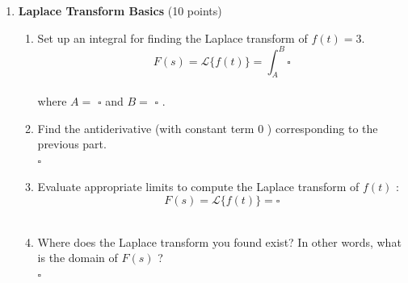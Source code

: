 \begin{enumerate}
  \item \textbf{Laplace Transform Basics} (10 points)\\
  \begin{enumerate}[label=\alph*]
    \item Set up an integral for finding the Laplace transform of $f(t)=3$.\\
    $$
    F(s)=\mathcal{L}\{f(t)\}=\int_A^B \square
    $$\\
    where $A=$ $\square$ and $B=$ $\square$ .\\
    \begin{subanswer}
    \end{subanswer}
    \item Find the antiderivative (with constant term 0 ) corresponding to the previous part.\\
    $\square$\\
    \begin{subanswer}
    \end{subanswer}
    \item Evaluate appropriate limits to compute the Laplace transform of $f(t)$ :\\
    $$
    F(s)=\mathcal{L}\{f(t)\}=\square
    $$\\
    \begin{subanswer}
    \end{subanswer}
    \item Where does the Laplace transform you found exist? In other words, what is the domain of $F(s)$ ?\\
    $\square$\\
    \begin{subanswer}
    \end{subanswer}
  \end{enumerate}


\end{enumerate}
